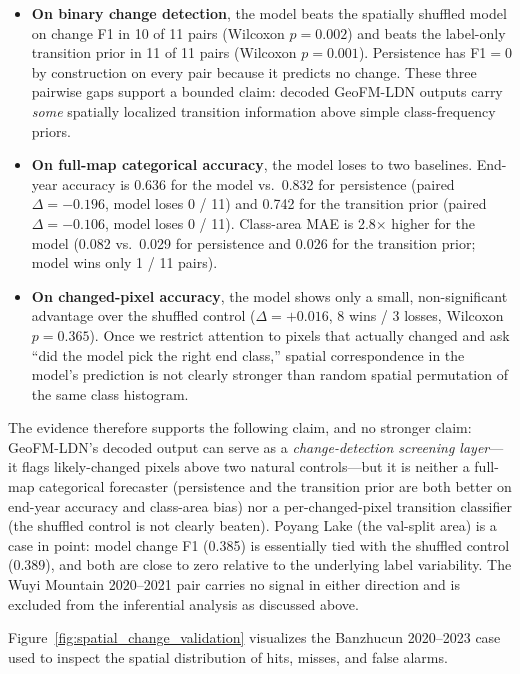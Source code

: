 \documentclass{article}
\begin{document}
\begin{itemize}
\item \textbf{On binary change detection}, the model beats the spatially shuffled model on change F1 in 10 of 11 pairs (Wilcoxon $p=0.002$) and beats the label-only transition prior in 11 of 11 pairs (Wilcoxon $p=0.001$). Persistence has F1$=0$ by construction on every pair because it predicts no change. These three pairwise gaps support a bounded claim: decoded GeoFM-LDN outputs carry \emph{some} spatially localized transition information above simple class-frequency priors.
\item \textbf{On full-map categorical accuracy}, the model loses to two baselines. End-year accuracy is 0.636 for the model vs.\ 0.832 for persistence (paired $\Delta = -0.196$, model loses 0 / 11) and 0.742 for the transition prior (paired $\Delta = -0.106$, model loses 0 / 11). Class-area MAE is 2.8$\times$ higher for the model (0.082 vs.\ 0.029 for persistence and 0.026 for the transition prior; model wins only 1 / 11 pairs).
\item \textbf{On changed-pixel accuracy}, the model shows only a small, non-significant advantage over the shuffled control ($\Delta=+0.016$, 8 wins / 3 losses, Wilcoxon $p=0.365$). Once we restrict attention to pixels that actually changed and ask ``did the model pick the right end class,'' spatial correspondence in the model's prediction is not clearly stronger than random spatial permutation of the same class histogram.
\end{itemize}

The evidence therefore supports the following claim, and no stronger claim: GeoFM-LDN's decoded output can serve as a \emph{change-detection screening layer}---it flags likely-changed pixels above two natural controls---but it is neither a full-map categorical forecaster (persistence and the transition prior are both better on end-year accuracy and class-area bias) nor a per-changed-pixel transition classifier (the shuffled control is not clearly beaten). Poyang Lake (the val-split area) is a case in point: model change F1 (0.385) is essentially tied with the shuffled control (0.389), and both are close to zero relative to the underlying label variability. The Wuyi Mountain 2020--2021 pair carries no signal in either direction and is excluded from the inferential analysis as discussed above.

Figure~\ref{fig:spatial_change_validation} visualizes the Banzhucun 2020--2023 case used to inspect the spatial distribution of hits, misses, and false alarms.
\end{document}
